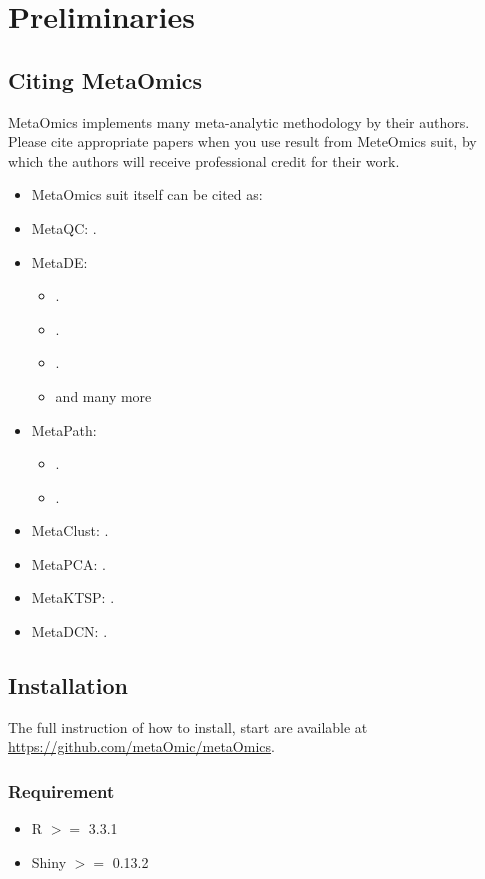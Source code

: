 \section{Preliminaries}
\subsection{Citing MetaOmics}
MetaOmics implements many meta-analytic methodology by their authors. 
Please cite appropriate papers when you use result from MeteOmics suit,
by which the authors will receive professional credit for their work.

\begin{itemize}
\item MetaOmics suit itself can be cited as:
\item MetaQC: .
\item MetaDE: 
\begin{itemize}
\item {}.
\item {}.
\item {}.
\item and many more
\end{itemize}
\item MetaPath: 
\begin{itemize}
\item {}.
\item {}.
\end{itemize}
\item MetaClust: .
\item MetaPCA: .
\item MetaKTSP: .
\item MetaDCN: .
\end{itemize}



\subsection{Installation}
The full instruction of how to install, start are available at \url{https://github.com/metaOmic/metaOmics}.
\subsubsection{Requirement}
\begin{itemize}
\item R $>=$ 3.3.1
\item Shiny $>=$ 0.13.2
\end{itemize}

